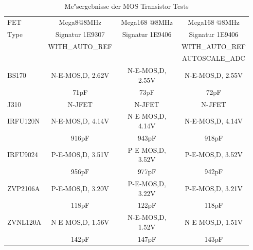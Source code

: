 \begin{table}[H]
  \begin{center}
    \begin{tabular}{| l | c | c | c |}
    \hline
     FET   & Mega8@8MHz      & Mega168 @8MHz   & Mega168 @8MHz \\
    Type   & Signatur 1E9307 & Signatur 1E9406 & Signatur 1E9406 \\
           & WITH\_AUTO\_REF &                 & WITH\_AUTO\_REF \\
           &                 &                 & AUTOSCALE\_ADC \\
    \hline
    \hline
BS170 & N-E-MOS,D, 2.62V & N-E-MOS,D, 2.55V & N-E-MOS,D, 2.55V \\
      &  71pF             &  73pF             &  72pF \\
    \hline
J310 & N-JFET             & N-JFET            & N-JFET\\
    \hline
IRFU120N & N-E-MOS,D, 4.14V & N-E-MOS,D, 4.14V & N-E-MOS,D, 4.14V\\
         & 916pF             & 943pF             & 918pF \\
    \hline
IRFU9024 & P-E-MOS,D, 3.51V & P-E-MOS,D, 3.52V & P-E-MOS,D, 3.52V\\
         & 956pF             & 977pF             & 942pF \\
    \hline
ZVP2106A & P-E-MOS,D, 3.20V & P-E-MOS,D, 3.22V & P-E-MOS,D, 3.21V\\
         & 118pF             & 122pF             & 118pF \\
    \hline
ZVNL120A & N-E-MOS,D, 1.56V & N-E-MOS,D, 1.52V & N-E-MOS,D, 1.51V \\
         & 142pF             & 147pF             & 143pF \\
    \hline
    \end{tabular}
  \end{center}
  \caption{Me"sergebnisse der MOS Transistor Tests}
  \label{tab:mos} 
\end{table}
